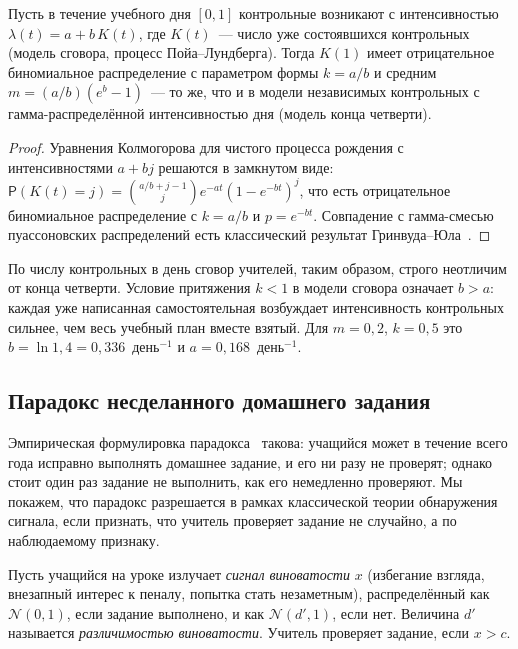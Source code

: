 \documentclass[11pt,a4paper]{article}
\begin{document}
\begin{theorem}
Пусть в течение учебного дня $[0,1]$ контрольные возникают с интенсивностью $\lambda(t) = a + b\,K(t)$, где $K(t)$~--- число уже состоявшихся контрольных (модель сговора, процесс Пойа--Лундберга). Тогда $K(1)$ имеет отрицательное биномиальное распределение с параметром формы $k = a/b$ и средним $m = (a/b)(e^{b}-1)$~--- то же, что и в модели независимых контрольных с гамма-распределённой интенсивностью дня (модель конца четверти).
\end{theorem}

\begin{proof}
Уравнения Колмогорова для чистого процесса рождения с интенсивностями $a+bj$ решаются в замкнутом виде: $\mathsf{P}(K(t)=j) = \binom{a/b+j-1}{j} e^{-at}(1-e^{-bt})^j$, что есть отрицательное биномиальное распределение с $k=a/b$ и $p = e^{-bt}$. Совпадение с гамма-смесью пуассоновских распределений есть классический результат Гринвуда--Юла~\cite{chetv}.
\end{proof}

По числу контрольных в день сговор учителей, таким образом, строго неотличим от конца четверти. Условие притяжения $k<1$ в модели сговора означает $b>a$: каждая уже написанная самостоятельная возбуждает интенсивность контрольных сильнее, чем весь учебный план вместе взятый. Для $m=0{,}2$, $k=0{,}5$ это $b = \ln 1{,}4 = 0{,}336$~день$^{-1}$ и $a = 0{,}168$~день$^{-1}$.

\subsection{Парадокс несделанного домашнего задания}

Эмпирическая формулировка парадокса~\cite{vinov} такова: учащийся может в течение всего года исправно выполнять домашнее задание, и его ни разу не проверят; однако стоит один раз задание не выполнить, как его немедленно проверяют. Мы покажем, что парадокс разрешается в рамках классической теории обнаружения сигнала, если признать, что учитель проверяет задание не случайно, а по наблюдаемому признаку.

Пусть учащийся на уроке излучает \emph{сигнал виноватости} $x$ (избегание взгляда, внезапный интерес к пеналу, попытка стать незаметным), распределённый как $\mathcal{N}(0,1)$, если задание выполнено, и как $\mathcal{N}(d',1)$, если нет. Величина $d'$ называется \emph{различимостью виноватости}. Учитель проверяет задание, если $x>c$.
\end{document}
